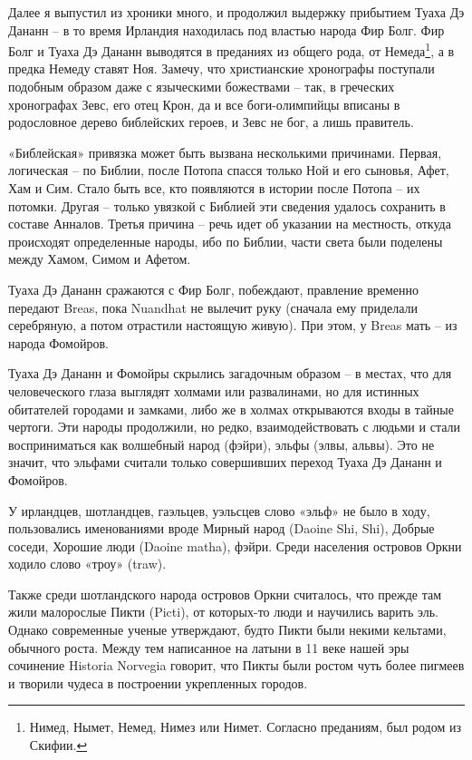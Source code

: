 Далее я выпустил из хроники много, и продолжил выдержку прибытием Туаха Дэ Дананн – в то время Ирландия находилась под властью народа Фир Болг. Фир Болг и Туаха Дэ Дананн выводятся в преданиях из общего рода, от Немеда\footnote{Нимед, Нымет, Немед, Нимез или Нимет. Согласно преданиям, был родом из Скифии.}, а в предка Немеду ставят Ноя. Замечу, что христианские хронографы поступали подобным образом даже с языческими божествами – так, в греческих хронографах Зевс, его отец Крон, да и все боги-олимпийцы вписаны в родословное дерево библейских героев, и Зевс не бог, а лишь правитель.

«Библейская» привязка может быть вызвана несколькими причинами. Первая, логическая – по Библии, после Потопа спасся только Ной и его сыновья, Афет, Хам и Сим. Стало быть все, кто появляются в истории после Потопа – их потомки. Другая – только увязкой с Библией эти сведения удалось сохранить в составе Анналов. Третья причина – речь идет об указании на местность, откуда происходят определенные народы, ибо по Библии, части света были поделены между Хамом, Симом и Афетом.
 
Туаха Дэ Дананн сражаются с Фир Болг, побеждают, правление временно передают Breas, пока Nuandhat не вылечит руку (сначала ему приделали серебряную, а потом отрастили настоящую живую). При этом, у Breas мать – из народа Фомойров.

Туаха Дэ Дананн и Фомойры скрылись загадочным образом – в местах, что для человеческого глаза выглядят холмами или развалинами, но для истинных обитателей городами и замками, либо же в холмах открываются входы в тайные чертоги. Эти народы продолжили, но редко, взаимодействовать с людьми и стали восприниматься как волшебный народ (фэйри), эльфы (элвы, альвы). Это не значит, что эльфами считали только совершивших переход Туаха Дэ Дананн и Фомойров.

У ирландцев, шотландцев, гаэльцев, уэльсцев слово «эльф» не было в ходу, пользовались именованиями вроде Мирный народ (Daoine Shi, Shi), Добрые соседи, Хорошие люди (Daoine matha), фэйри. Среди населения островов Оркни ходило слово «троу» (traw). 

Также среди шотландского народа островов Оркни считалось, что прежде там жили малорослые Пикти (Picti), от кото\-рых-то люди и научились варить эль. Однако современные ученые утверждают, будто Пикти были некими кельтами, обычного роста. Между тем написанное на латыни в 11 веке нашей эры сочинение Historia Norvegia говорит, что Пикты были ростом чуть более пигмеев и творили чудеса в построении укрепленных городов.


